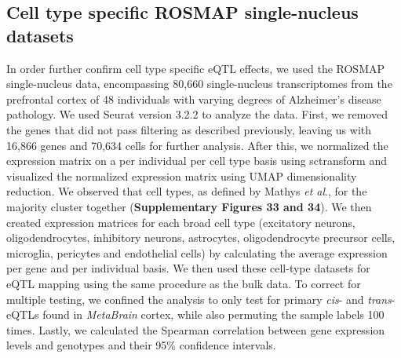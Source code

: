 \subsection{Cell type specific ROSMAP single-nucleus datasets }

In order further confirm cell type specific eQTL effects, we used the ROSMAP single-nucleus data, encompassing 80,660 single-nucleus transcriptomes from the prefrontal cortex of 48 individuals with varying degrees of Alzheimer’s disease pathology\cite{mathysSinglecellTranscriptomicAnalysis2019}. We used Seurat version 3.2.2\cite{stuartComprehensiveIntegrationSingleCell2019} to analyze the data. First, we removed the genes that did not pass filtering as described previously\cite{mathysSinglecellTranscriptomicAnalysis2019}, leaving us with 16,866 genes and 70,634 cells for further analysis. After this, we normalized the expression matrix on a per individual per cell type basis using sctransform\cite{hafemeisterNormalizationVarianceStabilization2019} and visualized the normalized expression matrix using UMAP dimensionality reduction\cite{mcinnesUMAPUniformManifold2020}. We observed that cell types, as defined by Mathys \textit{et al}\cite{mathysSinglecellTranscriptomicAnalysis2019}., for the majority cluster together (\textbf{Supplementary Figures 33 and 34}). We then created expression matrices for each broad cell type (excitatory neurons, oligodendrocytes, inhibitory neurons, astrocytes, oligodendrocyte precursor cells, microglia, pericytes and endothelial cells) by calculating the average expression per gene and per individual basis. We then used these cell-type datasets for eQTL mapping using the same procedure as the bulk data. To correct for multiple testing, we confined the analysis to only test for primary \textit{cis}- and \textit{trans}-eQTLs found in \textit{MetaBrain}  cortex, while also permuting the sample labels 100 times. Lastly, we calculated the Spearman correlation between gene expression levels and genotypes and their 95\% confidence intervals\cite{bonettSampleSizeRequirements2000}.  

